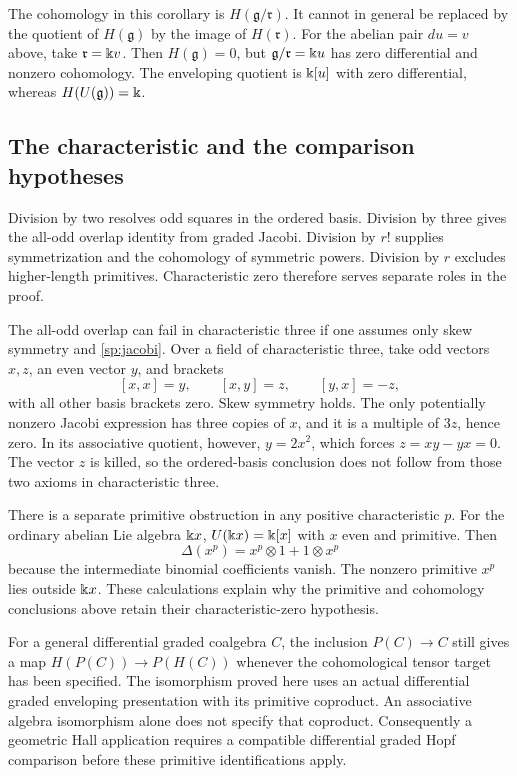 The cohomology in this corollary is $H(\mathfrak g/\mathfrak r)$.
It cannot in general be replaced by the quotient of $H(\mathfrak g)$
by the image of $H(\mathfrak r)$.
For the abelian pair $du=v$ above, take $\mathfrak r=\Bbbk v$.
Then $H(\mathfrak g)=0$, but $\mathfrak g/\mathfrak r=\Bbbk u$ has zero
differential and nonzero cohomology.  The enveloping quotient is
$\Bbbk[u]$ with zero differential, whereas $H(U(\mathfrak g))=\Bbbk$.

\subsection{The characteristic and the comparison hypotheses}

Division by two resolves odd squares in the ordered basis.
Division by three gives the all-odd overlap identity from graded Jacobi.
Division by $r!$ supplies symmetrization and the cohomology of symmetric
powers.  Division by $r$ excludes higher-length primitives.
Characteristic zero therefore serves separate roles in the proof.

The all-odd overlap can fail in characteristic three if one assumes
only skew symmetry and \eqref{sp:jacobi}.
Over a field of characteristic three, take odd vectors $x,z$, an even
vector $y$, and brackets
\[
 [x,x]=y,\qquad [x,y]=z,\qquad [y,x]=-z,
\]
with all other basis brackets zero.  Skew symmetry holds.
The only potentially nonzero Jacobi expression has three copies of
$x$, and it is a multiple of $3z$, hence zero.
In its associative quotient, however, $y=2x^2$, which forces
$z=xy-yx=0$.  The vector $z$ is killed, so the ordered-basis conclusion
does not follow from those two axioms in characteristic three.

There is a separate primitive obstruction in any positive
characteristic $p$.  For the ordinary abelian Lie algebra $\Bbbk x$,
$U(\Bbbk x)=\Bbbk[x]$ with $x$ even and primitive.  Then
\[
 \Delta(x^p)=x^p\otimes1+1\otimes x^p
\]
because the intermediate binomial coefficients vanish.
The nonzero primitive $x^p$ lies outside $\Bbbk x$.
These calculations explain why the primitive and cohomology
conclusions above retain their characteristic-zero hypothesis.

For a general differential graded coalgebra $C$, the inclusion
$P(C)\to C$ still gives a map $H(P(C))\to P(H(C))$ whenever the
cohomological tensor target has been specified.
The isomorphism proved here uses an actual differential graded
enveloping presentation with its primitive coproduct.
An associative algebra isomorphism alone does not specify that
coproduct.  Consequently a geometric Hall application requires a
compatible differential graded Hopf comparison before these primitive
identifications apply.
